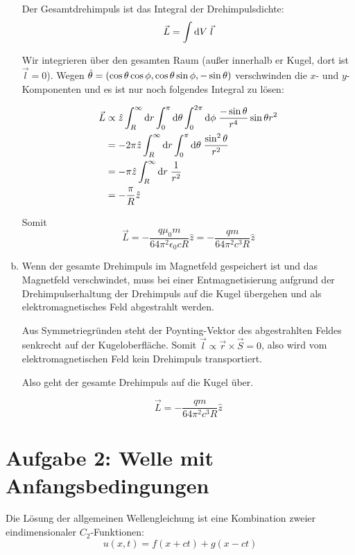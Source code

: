 \documentclass[a4paper,german,12pt,smallheadings]{scrartcl}
\begin{document}
\begin{enumerate}[a)]
Der Gesamtdrehimpuls ist das Integral der Drehimpulsdichte:
\begin{equation}
  \vec{L} = \int \dif V \; \vec{l}
\end{equation}

Wir integrieren über den gesamten Raum (außer innerhalb er Kugel, dort ist
$\vec{l} = 0$). Wegen $\hat{\theta} = \del{\cos \theta \cos \phi, \cos \theta
\sin \phi, - \sin \theta}$ verschwinden die $x$- und $y$-Komponenten und es
ist nur noch folgendes Integral zu lösen:

\begin{align*}
  \vec{L} &\propto \hat{z} \int_R^\infty \dif r \int_0^\pi \dif \theta \int_0^{2 \pi} \dif \phi \; \frac{- \sin \theta}{r^4} \sin \theta r^2 \\
          &= -2 \pi \hat{z} \int_R^\infty \dif r \int_0^\pi \dif \theta \; \frac{\sin^2 \theta}{r^2} \\
          &= -\pi \hat{z} \int_R^\infty \dif r \; \frac{1}{r^2} \\
          &= -\frac{\pi}{R} \hat{z}
\end{align*}

Somit
\begin{equation}
  \vec{L} = -\frac{q \mu_0 m}{64 \pi^2 \epsilon_0 c R} \hat{z} = -\frac{qm}{64 \pi^2 c^3 R} \hat{z}
\end{equation}
\item
  Wenn der gesamte Drehimpuls im Magnetfeld gespeichert ist und das Magnetfeld
  verschwindet, muss bei einer Entmagnetisierung aufgrund der
  Drehimpulserhaltung der Drehimpuls auf die Kugel übergehen und als
  elektromagnetisches Feld abgestrahlt werden.

  Aus Symmetriegründen steht der Poynting-Vektor des abgestrahlten Feldes
  senkrecht auf der Kugeloberfläche. Somit $\vec{l} \propto \vec{r} \times
  \vec{S} = 0$, also wird vom elektromagnetischen Feld kein Drehimpuls
  transportiert.

  Also geht der gesamte Drehimpuls auf die Kugel über.

  \begin{equation}
    \vec{L} = -\frac{qm}{64 \pi^2 c^3 R} \hat{z}
  \end{equation}
\end{enumerate}


\section*{Aufgabe 2: Welle mit Anfangsbedingungen}
Die Lösung der allgemeinen Wellengleichung ist eine Kombination zweier eindimensionaler $C_2$-Funktionen:
\begin{equation}
  u(x,t) = f(x+ct) + g(x-ct)
\end{equation}
\end{document}
